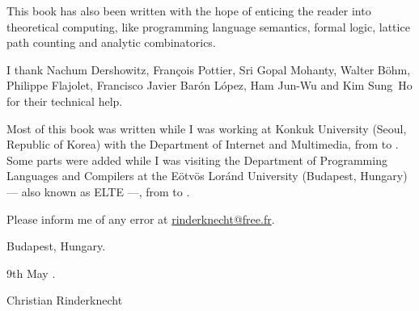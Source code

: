 This book has also been written with the hope of enticing the reader
into theoretical computing, like programming language semantics,
formal logic, lattice path counting and analytic combinatorics.

I thank Nachum Dershowitz, Fran\c{c}ois Pottier, Sri Gopal Mohanty,
Walter B\"ohm, Philippe Flajolet, Francisco Javier Bar\'on L\'opez,
Ham Jun-Wu and Kim Sung~Ho for their technical help.

Most of this book was written while I was working at Konkuk University
(Seoul, Republic of Korea) with the Department of Internet and
Multimedia, from  to . Some
parts were added while I was visiting the Department of Programming
Languages and Compilers at the E\"otv\"os Lor\'and University
(Budapest, Hungary) --- also known as ELTE ---, from
 to .

Please inform me of any error at \url{rinderknecht@free.fr}.

\bigskip

\hfill{}Budapest, Hungary.


\hfill{}9th May .

\bigskip

\hfill{}Christian Rinderknecht
